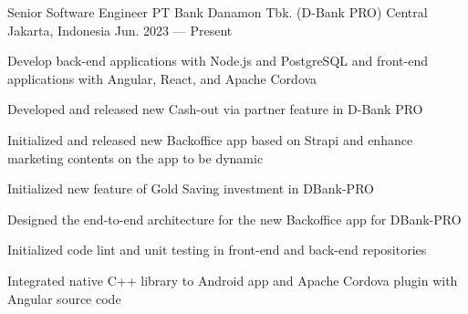 

\begin{cventries}

  \cventry
  {Senior Software Engineer}
  {PT Bank Danamon Tbk. (D-Bank PRO)}
  {Central Jakarta, Indonesia}
  {Jun. 2023 --- Present}
  {
    \begin{cvitems}
      \item {Develop back-end applications with Node.js and PostgreSQL and front-end applications with Angular, React, and Apache Cordova}
      \item {Developed and released new Cash-out via partner feature in D-Bank PRO}
      \item {Initialized and released new Backoffice app based on Strapi and enhance marketing contents on the app to be dynamic}
      \item {Initialized new feature of Gold Saving investment in DBank-PRO}
      \item {Designed the end-to-end architecture for the new Backoffice app for DBank-PRO}
      \item {Initialized code lint and unit testing in front-end and back-end repositories}
      \item {Integrated native C++ library to Android app and Apache Cordova plugin with Angular source code}
    \end{cvitems}
  }


\end{cventries}
